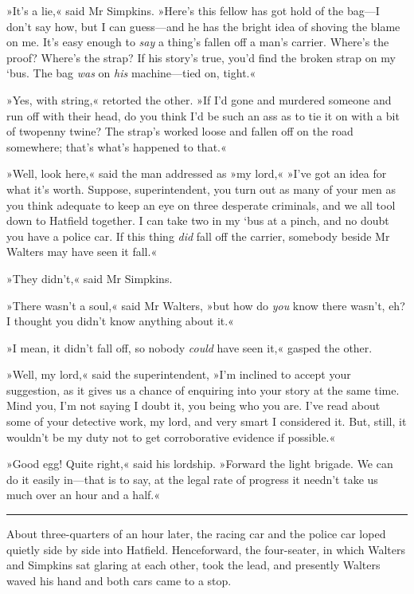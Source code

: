 »It's a lie,« said Mr Simpkins. »Here's this fellow has got hold of the bag—I don't say how, but I can guess—and he has the bright idea of shoving the blame on me. It's easy enough to \textit{say} a thing's fallen off a man's carrier. Where's the proof? Where's the strap? If his story's true, you'd find the broken strap on my `bus. The bag \textit{was} on \textit{his} machine—tied on, tight.«

»Yes, with string,« retorted the other. »If I'd gone and murdered someone and run off with their head, do you think I'd be such an ass as to tie it on with a bit of twopenny twine? The strap's worked loose and fallen off on the road somewhere; that's what's happened to that.«

»Well, look here,« said the man addressed as »my lord,« »I've got an idea for what it's worth. Suppose, superintendent, you turn out as many of your men as you think adequate to keep an eye on three desperate criminals, and we all tool down to Hatfield together. I can take two in my `bus at a pinch, and no doubt you have a police car. If this thing \textit{did} fall off the carrier, somebody beside Mr Walters may have seen it fall.«

»They didn't,« said Mr Simpkins.

»There wasn't a soul,« said Mr Walters, »but how do \textit{you} know there wasn't, eh? I thought you didn't know anything about it.«

»I mean, it didn't fall off, so nobody \textit{could} have seen it,« gasped the other.

»Well, my lord,« said the superintendent, »I'm inclined to accept your suggestion, as it gives us a chance of enquiring into your story at the same time. Mind you, I'm not saying I doubt it, you being who you are. I've read about some of your detective work, my lord, and very smart I considered it. But, still, it wouldn't be my duty not to get corroborative evidence if possible.«

»Good egg! Quite right,« said his lordship. »Forward the light brigade. We can do it easily in—that is to say, at the legal rate of progress it needn't take us much over an hour and a half.«

\noindent\hfil\rule{0.5\textwidth}{.4pt}\hfil 

About three-quarters of an hour later, the racing car and the police car loped quietly side by side into Hatfield. Henceforward, the four-seater, in which Walters and Simpkins sat glaring at each other, took the lead, and presently Walters waved his hand and both cars came to a stop.

